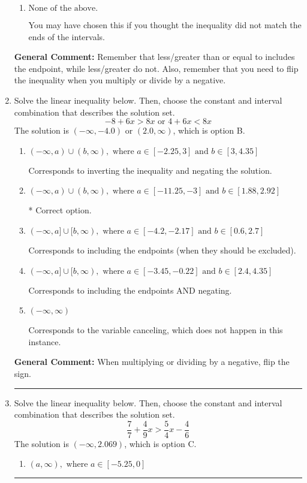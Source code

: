 \documentclass{extbook}[14pt]
\newcommand{\litem}[1]{\item #1

\rule{\textwidth}{0.4pt}}
\begin{document}
\begin{enumerate}
{\begin{enumerate}[label=\Alph*.]
 $(1.077, \infty)$, which corresponds to switching the direction of the interval AND negating the endpoint. You likely did this if you did not flip the inequality when dividing by a negative as well as not moving values over to a side properly.
\item \( \text{None of the above}. \)

You may have chosen this if you thought the inequality did not match the ends of the intervals.
\end{enumerate}

\textbf{General Comment:} Remember that less/greater than or equal to includes the endpoint, while less/greater do not. Also, remember that you need to flip the inequality when you multiply or divide by a negative.
}
\litem{
Solve the linear inequality below. Then, choose the constant and interval combination that describes the solution set.
\[ -8 + 6 x > 8 x \text{ or } 4 + 6 x < 8 x \]The solution is \( (-\infty, -4.0) \text{ or } (2.0, \infty) \), which is option B.\begin{enumerate}[label=\Alph*.]
\item \( (-\infty, a) \cup (b, \infty), \text{ where } a \in [-2.25, 3] \text{ and } b \in [3, 4.35] \)

Corresponds to inverting the inequality and negating the solution.
\item \( (-\infty, a) \cup (b, \infty), \text{ where } a \in [-11.25, -3] \text{ and } b \in [1.88, 2.92] \)

 * Correct option.
\item \( (-\infty, a] \cup [b, \infty), \text{ where } a \in [-4.2, -2.17] \text{ and } b \in [0.6, 2.7] \)

Corresponds to including the endpoints (when they should be excluded).
\item \( (-\infty, a] \cup [b, \infty), \text{ where } a \in [-3.45, -0.22] \text{ and } b \in [2.4, 4.35] \)

Corresponds to including the endpoints AND negating.
\item \( (-\infty, \infty) \)

Corresponds to the variable canceling, which does not happen in this instance.
\end{enumerate}

\textbf{General Comment:} When multiplying or dividing by a negative, flip the sign.
}
\litem{
Solve the linear inequality below. Then, choose the constant and interval combination that describes the solution set.
\[ \frac{7}{7} + \frac{4}{9} x > \frac{5}{4} x - \frac{4}{6} \]The solution is \( (-\infty, 2.069) \), which is option C.\begin{enumerate}[label=\Alph*.]
\item \( (a, \infty), \text{ where } a \in [-5.25, 0] \)


\end{enumerate}}
\end{enumerate}
\end{document}
